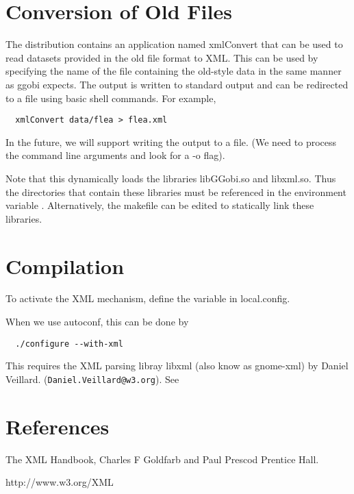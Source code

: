 \documentclass{article}
\begin{document}
\section{Conversion of Old Files}
The distribution contains an application named xmlConvert that can be
used to read datasets provided in the old file format to XML.  This
can be used by specifying the name of the file containing the
old-style data in the same manner as ggobi expects.
The output is written to standard output
and can be redirected to a file using basic shell commands.
For example,
\begin{verbatim}
  xmlConvert data/flea > flea.xml
\end{verbatim}
In the future, we will support writing the output to a file. (We need
to process the command line arguments and look for a -o flag).


Note that this dynamically loads the libraries libGGobi.so and
libxml.so.  Thus the directories that contain these libraries must be
referenced in the environment variable 
.
Alternatively, the makefile can be edited to statically link these
libraries.


\section{Compilation}
To activate the XML mechanism, define the variable
 in  local.config.

When we use autoconf, this can be done by
\begin{verbatim}
  ./configure --with-xml
\end{verbatim}

This requires the XML parsing libray libxml (also know as gnome-xml) by Daniel Veillard.
(\texttt{Daniel.Veillard@w3.org}).
See 
\section{References}
The XML Handbook, Charles F Goldfarb and Paul Prescod
 Prentice Hall.

http://www.w3.org/XML
\end{document}
